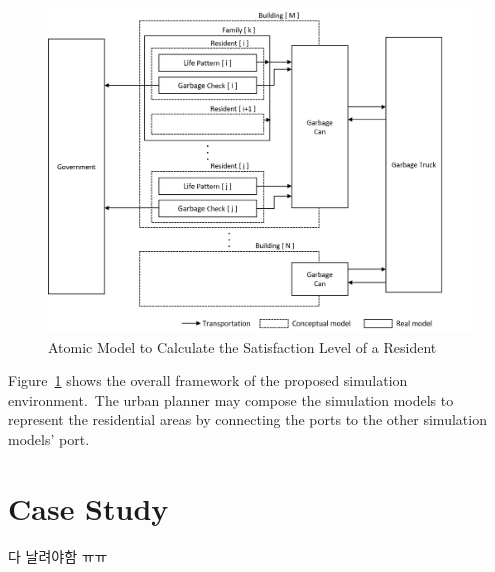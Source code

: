 \documentclass{scsSimAUDPaperFormat}
\begin{document}


\begin{figure}[ht]
    \centering
    \includegraphics[width=1.5\columnwidth]{fig/Framework}
    \caption{Atomic Model to Calculate the Satisfaction Level of a Resident}
    \label{Fig:Framework}
\end{figure}


Figure~\ref{Fig:Framework} shows the overall framework of the proposed simulation environment.~The urban planner may compose the simulation models to represent the residential areas by connecting the ports to the other simulation models' port.

\section{Case Study}

 다 날려야함 ㅠㅠ
\end{document}
